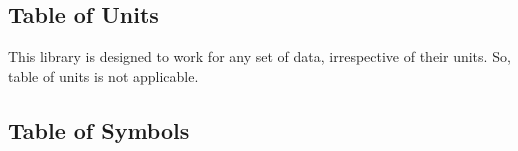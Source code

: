 \documentclass[12pt]{article}
\begin{document}
\subsection{Table of Units}
This library is designed to work for any set of data, irrespective of their units. So, table of units is not applicable. 

\subsection{Table of Symbols}
\end{document}
